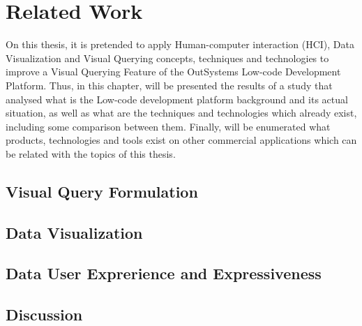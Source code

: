 \chapter{Related Work}
\label{cha:related_work}
On this thesis, it is pretended to apply Human-computer interaction (HCI), Data Visualization and Visual Querying concepts, techniques and technologies to improve a Visual Querying Feature of the OutSystems Low-code Development Platform. Thus, in this chapter, will be presented the results of a study that analysed what is the Low-code development platform background and its actual situation, as well as what are the techniques and technologies which already exist, including some comparison between them. Finally, will be enumerated what products, technologies and tools exist on other commercial applications which can be related with the topics of this thesis.

\section{Visual Query Formulation}
\label{sec:visual_query_formulation}

\section{Data Visualization}
\label{sec:data_visualization}

\section{Data User Exprerience and Expressiveness}
\label{sec:data_user_experience_and_expressiveness}

\section{Discussion}
\label{sec:discussion}